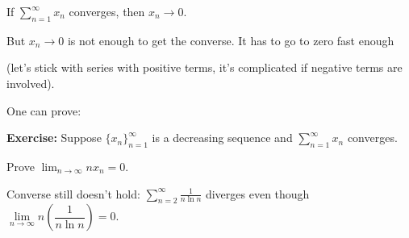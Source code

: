 \documentclass[10pt,aspectratio=169]{beamer}
\begin{document}
\begin{frame}

If $\displaystyle \sum_{n=1}^\infty x_n$ converges, then $x_n \to 0$.  

\pause
\medskip

But $x_n \to 0$ is not enough to get the converse.
It has to go to zero fast enough

(let's stick with series with positive terms, it's
complicated if negative terms are involved).

\pause
\medskip

One can prove:

\medskip

\textbf{Exercise:}
Suppose $\{ x_n \}_{n=1}^\infty$ is a decreasing sequence and
$\displaystyle\sum_{n=1}^\infty x_n$ converges.

Prove $\displaystyle \lim_{n\to\infty} n x_n = 0$.

\pause
\medskip

Converse still doesn't hold:
$\displaystyle \sum_{n=2}^\infty \frac{1}{n \ln n}$ diverges
even though $\lim\limits_{n\to \infty} n \left( \dfrac{1}{n \ln n} \right) = 0$.

\end{frame}
\end{document}
